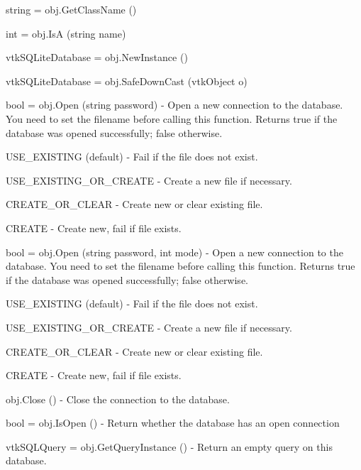 \begin{DoxyItemize}
\item {\ttfamily string = obj.\-Get\-Class\-Name ()}  
\item {\ttfamily int = obj.\-Is\-A (string name)}  
\item {\ttfamily vtk\-S\-Q\-Lite\-Database = obj.\-New\-Instance ()}  
\item {\ttfamily vtk\-S\-Q\-Lite\-Database = obj.\-Safe\-Down\-Cast (vtk\-Object o)}  
\item {\ttfamily bool = obj.\-Open (string password)} -\/ Open a new connection to the database. You need to set the filename before calling this function. Returns true if the database was opened successfully; false otherwise.
\begin{DoxyItemize}
\item U\-S\-E\-\_\-\-E\-X\-I\-S\-T\-I\-N\-G (default) -\/ Fail if the file does not exist.
\item U\-S\-E\-\_\-\-E\-X\-I\-S\-T\-I\-N\-G\-\_\-\-O\-R\-\_\-\-C\-R\-E\-A\-T\-E -\/ Create a new file if necessary.
\item C\-R\-E\-A\-T\-E\-\_\-\-O\-R\-\_\-\-C\-L\-E\-A\-R -\/ Create new or clear existing file.
\item C\-R\-E\-A\-T\-E -\/ Create new, fail if file exists.  
\end{DoxyItemize}
\item {\ttfamily bool = obj.\-Open (string password, int mode)} -\/ Open a new connection to the database. You need to set the filename before calling this function. Returns true if the database was opened successfully; false otherwise.
\begin{DoxyItemize}
\item U\-S\-E\-\_\-\-E\-X\-I\-S\-T\-I\-N\-G (default) -\/ Fail if the file does not exist.
\item U\-S\-E\-\_\-\-E\-X\-I\-S\-T\-I\-N\-G\-\_\-\-O\-R\-\_\-\-C\-R\-E\-A\-T\-E -\/ Create a new file if necessary.
\item C\-R\-E\-A\-T\-E\-\_\-\-O\-R\-\_\-\-C\-L\-E\-A\-R -\/ Create new or clear existing file.
\item C\-R\-E\-A\-T\-E -\/ Create new, fail if file exists.  
\end{DoxyItemize}
\item {\ttfamily obj.\-Close ()} -\/ Close the connection to the database.  
\item {\ttfamily bool = obj.\-Is\-Open ()} -\/ Return whether the database has an open connection  
\item {\ttfamily vtk\-S\-Q\-L\-Query = obj.\-Get\-Query\-Instance ()} -\/ Return an empty query on this database.  

\end{DoxyItemize}
